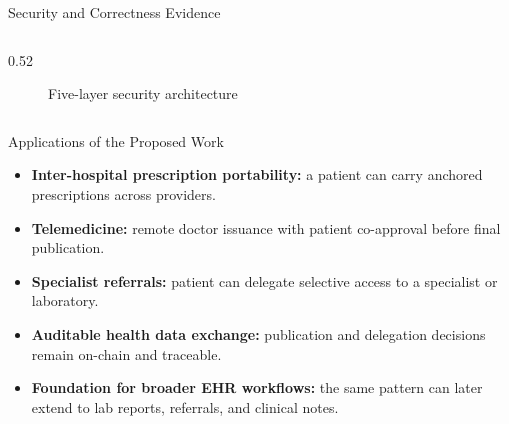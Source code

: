 \documentclass[10pt]{beamer}
\begin{document}
\begin{frame}{Security and Correctness Evidence}
\begin{columns}[c]
\begin{column}{0.52\textwidth}
\begin{figure}
{
}
\caption{Five-layer security architecture}
\end{figure}
\end{column}

\end{columns}
\end{frame}


\begin{frame}{Applications of the Proposed Work}
\small
\begin{itemize}
  \item \textbf{Inter-hospital prescription portability:} a patient can carry anchored prescriptions across providers.
  \item \textbf{Telemedicine:} remote doctor issuance with patient co-approval before final publication.
  \item \textbf{Specialist referrals:} patient can delegate selective access to a specialist or laboratory.
  \item \textbf{Auditable health data exchange:} publication and delegation decisions remain on-chain and traceable.
  \item \textbf{Foundation for broader EHR workflows:} the same pattern can later extend to lab reports, referrals, and clinical notes.
\end{itemize}
\end{frame}
\end{document}

